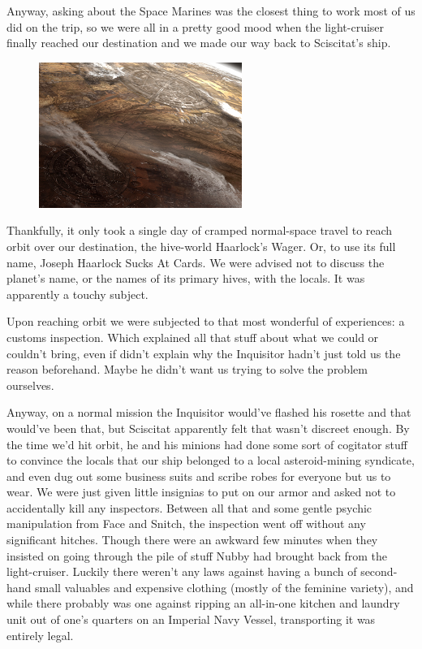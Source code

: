 Anyway, asking about the Space Marines was the closest thing to work most of us did on the trip, so we were all in a pretty good mood when the light-cruiser finally reached our destination and we made our way back to Sciscitat's ship.

\begin{figure}
	\begin{center}
		\includegraphics[width=\figwidth]{pics/17/28.png}
	\end{center}
\end{figure}
Thankfully, it only took a single day of cramped normal-space travel to reach orbit over our destination, the hive-world Haarlock's Wager. 
Or, to use its full name, Joseph Haarlock Sucks At Cards. 
We were advised not to discuss the planet's name, or the names of its primary hives, with the locals. 
It was apparently a touchy subject. 


Upon reaching orbit we were subjected to that most wonderful of experiences: 
a customs inspection. 
Which explained all that stuff about what we could or couldn't bring, even if didn't explain why the Inquisitor hadn't just told us the reason beforehand. 
Maybe he didn't want us trying to solve the problem ourselves.

Anyway, on a normal mission the Inquisitor would've flashed his rosette and that would've been that, but Sciscitat apparently felt that wasn't discreet enough. 
By the time we'd hit orbit, he and his minions had done some sort of cogitator stuff to convince the locals that our ship belonged to a local asteroid-mining syndicate, and even dug out some business suits and scribe robes for everyone but us to wear. 
We were just given little insignias to put on our armor and asked not to accidentally kill any inspectors. 
Between all that and some gentle psychic manipulation from Face and Snitch, the inspection went off without any significant hitches. 
Though there were an awkward few minutes when they insisted on going through the pile of stuff Nubby had brought back from the light-cruiser. 
Luckily there weren't any laws against having a bunch of second-hand small valuables and expensive clothing (mostly of the feminine variety), and while there probably was one against ripping an all-in-one kitchen and laundry unit out of one's quarters on an Imperial Navy Vessel, transporting it was entirely legal.

